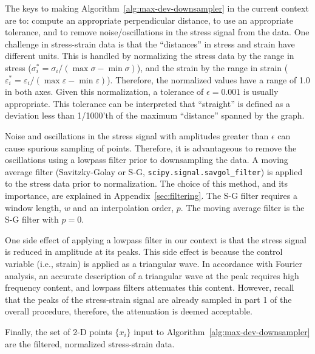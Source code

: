 \documentclass[a4paper,11pt]{article}
\begin{document}
The keys to making Algorithm~\ref{alg:max-dev-downsampler} in the current context are to: compute an appropriate perpendicular distance, to use an appropriate tolerance, and to remove noise/oscillations in the stress signal from the data.
One challenge in stress-strain data is that the ``distances'' in stress and strain have different units.
This is handled by normalizing the stress data by the range in stress ($\sigma_i^* = \sigma_i / (\max \sigma - \min \sigma)$), and the strain by the range in strain ($\varepsilon_i^* = \varepsilon_i / (\max \varepsilon - \min \varepsilon)$).
Therefore, the normalized values have a range of 1.0 in both axes.
Given this normalization, a tolerance of $\epsilon = 0.001$ is usually appropriate.
This tolerance can be interpreted that ``straight'' is defined as a deviation less than 1/1000'th of the maximum ``distance'' spanned by the graph.

Noise and oscillations in the stress signal with amplitudes greater than $\epsilon$ can cause spurious sampling of points.
Therefore, it is advantageous to remove the oscillations using a lowpass filter prior to downsampling the data.
A moving average filter (Savitzky-Golay or S-G, \texttt{scipy.signal.savgol\_filter}) is applied to the stress data prior to normalization.
The choice of this method, and its importance, are explained in Appendix~\ref{sec:filtering}.
The S-G filter requires a window length, $w$ and an interpolation order, $p$.
The moving average filter is the S-G filter with $p = 0$.

One side effect of applying a lowpass filter in our context is that the stress signal is reduced in amplitude at its peaks.
This side effect is because the control variable (i.e., strain) is applied as a triangular wave.
In accordance with Fourier analysis, an accurate description of a triangular wave at the peak requires high frequency content, and lowpass filters attenuates this content. 
However, recall that the peaks of the stress-strain signal are already sampled in part 1 of the overall procedure, therefore, the attenuation is deemed acceptable.

Finally, the set of 2-D points $\{x_i\}$ input to Algorithm~\ref{alg:max-dev-downsampler} are the filtered, normalized stress-strain data.
\end{document}
